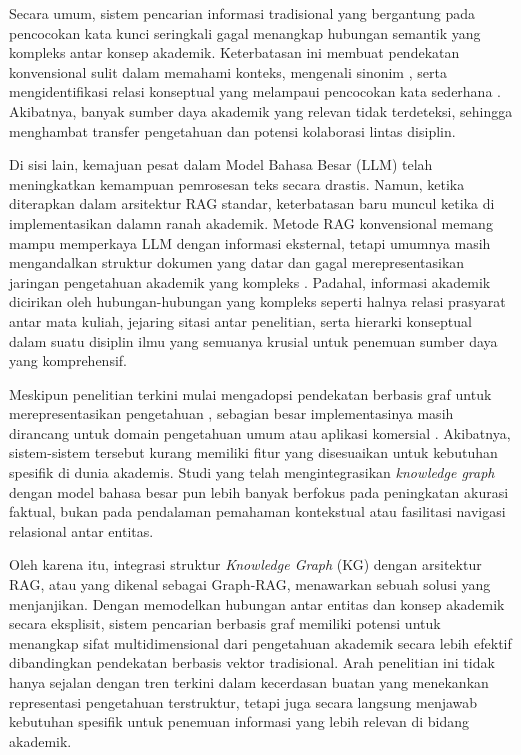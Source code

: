 Secara umum, sistem pencarian informasi tradisional yang bergantung pada pencocokan kata kunci seringkali gagal menangkap hubungan semantik yang kompleks antar konsep akademik. Keterbatasan ini membuat pendekatan konvensional sulit dalam memahami konteks, mengenali sinonim \cite{indexingbylatent}, serta mengidentifikasi relasi konseptual yang melampaui pencocokan kata sederhana \cite{introretrieval}. Akibatnya, banyak sumber daya akademik yang relevan tidak terdeteksi, sehingga menghambat transfer pengetahuan dan potensi kolaborasi lintas disiplin.

Di sisi lain, kemajuan pesat dalam Model Bahasa Besar (LLM) telah meningkatkan kemampuan pemrosesan teks secara drastis. Namun, ketika diterapkan dalam arsitektur RAG standar, keterbatasan baru muncul ketika di implementasikan dalamn ranah akademik. Metode RAG konvensional memang mampu memperkaya LLM dengan informasi eksternal, tetapi umumnya masih mengandalkan struktur dokumen yang datar dan gagal merepresentasikan jaringan pengetahuan akademik yang kompleks \cite{retrievalaugmentedgenerationlargelanguage}. Padahal, informasi akademik dicirikan oleh hubungan-hubungan yang kompleks seperti halnya relasi prasyarat antar mata kuliah, jejaring sitasi antar penelitian, serta hierarki konseptual dalam suatu disiplin ilmu yang semuanya krusial untuk penemuan sumber daya yang komprehensif.

Meskipun penelitian terkini mulai mengadopsi pendekatan berbasis graf untuk merepresentasikan pengetahuan \cite{edge2025localglobalgraphrag, guo2025lightragsimplefastretrievalaugmented, wu2024medicalgraphragsafe, qian2025memoragboostinglongcontext, peng2024graphretrievalaugmentedgenerationsurvey}, sebagian besar implementasinya masih dirancang untuk domain pengetahuan umum atau aplikasi komersial \cite{wu2024medicalgraphragsafe, edge2025localglobalgraphrag}. Akibatnya, sistem-sistem tersebut kurang memiliki fitur yang disesuaikan untuk kebutuhan spesifik di dunia akademis. Studi yang telah mengintegrasikan \textit{knowledge graph} dengan model bahasa besar pun lebih banyak berfokus pada peningkatan akurasi faktual, bukan pada pendalaman pemahaman kontekstual atau fasilitasi navigasi relasional antar entitas.

Oleh karena itu, integrasi struktur \textit{Knowledge Graph} (KG) dengan arsitektur RAG, atau yang dikenal sebagai Graph-RAG, menawarkan sebuah solusi yang menjanjikan. Dengan memodelkan hubungan antar entitas dan konsep akademik secara eksplisit, sistem pencarian berbasis graf memiliki potensi untuk menangkap sifat multidimensional dari pengetahuan akademik secara lebih efektif dibandingkan pendekatan berbasis vektor tradisional. Arah penelitian ini tidak hanya sejalan dengan tren terkini dalam kecerdasan buatan yang menekankan representasi pengetahuan terstruktur, tetapi juga secara langsung menjawab kebutuhan spesifik untuk penemuan informasi yang lebih relevan di bidang akademik.

